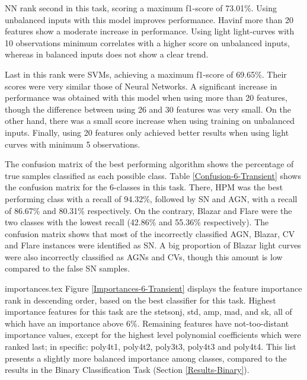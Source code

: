 \documentclass[a4paper,fleqn,usenatbib]{mnras}
\begin{document}
NN rank second in this task, scoring a maximum f1-score of 73.01\%. 
Using unbalanced inputs with this model improves performance.
Havinf more than 20 features show a moderate increase in
performance.
Using light light-curves with 10 observations minimum correlates with a
higher score on unbalanced inputs, whereas in balanced inputs does not
show a clear trend. 

Last in this rank were SVMs, achieving a maximum f1-score of 69.65\%. Their scores were very similar those of Neural Networks. A significant increase in performance was obtained with this model when using more than 20 features, though the difference between using 26 and 30 features was very small. On the other hand, there was a small score increase when using training on unbalanced inputs. Finally, using 20 features only achieved better results when using light curves with minimum 5 observations.

The confusion matrix of the best performing algorithm shows the percentage of true samples classified as each possible class. 
Table \ref{Confusion-6-Transient} shows the confusion matrix for the 6-classes in this task. There, HPM was the best performing class with a recall of 94.32\%, followed by SN and AGN, with a recall of 86.67\% and 80.31\% respectively. On the contrary, Blazar and Flare were the two classes with the lowest recall (42.86\% and 55.36\% respectively). The confusion matrix shows that most of the incorrectly classified AGN, Blazar, CV and Flare instances were identified as SN. A big proportion of Blazar light curves were also incorrectly classified as AGNs and CVs, though this amount is low compared to the false SN samples.


{importances.tex}
Figure \ref{Importances-6-Transient} displays the feature importance rank in descending order, based on the best classifier for this task. 
Highest importance features for this task are the
stetson\textunderscore j, std, amp, mad, and sk, all of which have an importance above 6\%. 
Remaining features have not-too-distant importance values, except for the highest level polynomial coefficients which were ranked last; in specific: 
poly4\textunderscore t1, poly4\textunderscore t2, poly3\textunderscore t3, poly4\textunderscore t3 and poly4\textunderscore t4. 
This list presents a slightly more balanced importance among classes, compared to the results in the Binary Classification Task (Section \ref{Results-Binary}).
\end{document}
